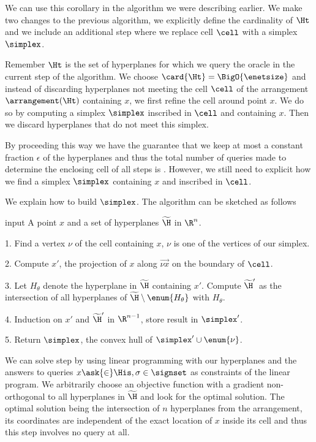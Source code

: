 We can use this corollary in the algorithm we were describing earlier. We
make two changes to the previous algorithm, we explicitly define the
cardinality of $\Ht$ and we include an additional step where we replace cell
$\cell$ with a simplex $\simplex$.

Remember \(\Ht\) is the set of hyperplanes for which we query the oracle
in the current step of the algorithm. We choose \(\card{\Ht} = \BigO{\enetsize}\) and
instead of discarding hyperplanes not meeting the cell $\cell$ of the
arrangement $\arrangement(\Ht)$ containing $x$, we first refine the cell around
point $x$. We do so by computing a simplex $\simplex$ inscribed in $\cell$ and
containing \(x\). Then we discard hyperplanes that do not meet this simplex.

By proceeding this way we have the guarantee that we keep at most a
constant fraction \(\epsilon\) of the hyperplanes and thus the total number of
queries made to determine the enclosing cell of
all steps is . However, we
still need to explicit how we find a simplex $\simplex$ containing $x$ and
inscribed in $\cell$.

We explain how to build $\simplex$. The algorithm can be sketched as
follows
\begin{algorithm}
\item[input] A point \(x\) and a set of hyperplanes \(\widetilde{\H}\) in
\(\R^n\).
\item[1.] Find a vertex $\nu$ of the cell containing $x$, $\nu$ is one of
the vertices of our simplex.
\item[2.] Compute $x'$, the projection of $x$ along $\vec{\nu x}$ on the
boundary of \(\cell\).
\item[3.] Let \(H_{\theta}\) denote the hyperplane in \(\widetilde{\H}\)
containing \(x'\). Compute \(\widetilde{\H}'\) as the intersection of all
hyperplanes of \(\widetilde{\H} \setminus \enum{H_{\theta}}\) with
\(H_{\theta}\).
\item[4.] Induction on \(x'\) and \(\widetilde{\H}'\) in $\R^{n-1}$, store result in \(\simplex'\).
\item[5.] Return \(\simplex\), the convex hull of \(\simplex' \cup \enum{\nu}\).
\end{algorithm}

We can solve step  by using linear programming with our  hyperplanes and the answers to queries $x \ask{\in} \His, \sigma \in
\signset$ as constraints of the linear program. We arbitrarily choose an
objective function with a gradient non-orthogonal to all hyperplanes in
\(\widetilde{\H}\) and look for
the optimal solution. The optimal solution being the intersection of \(n\)
hyperplanes from the arrangement, its coordinates are independent of the exact
location of \(x\) inside its cell and thus this step involves no query at all.

